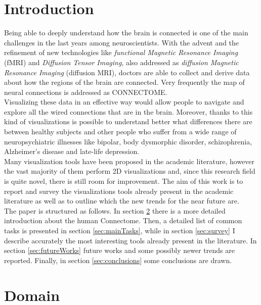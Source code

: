 \documentclass{article}
\begin{document}
\begin{multicols}{2}
\raggedcolumns

\section{Introduction}
\label{sec:introduction}

Being able to deeply understand how the brain is connected is one of the main challenges in the last years among neuroscientists. With the advent and the refinement of new technologies like \textit{functional Magnetic Resonance Imaging} (fMRI) and \textit{Diffusion Tensor Imaging}, also addressed as \textit{diffusion Magnetic Resonance Imaging} (diffusion MRI), doctors are able to collect and derive data about how the regions of the brain are connected. Very frequently the map of neural connections is addressed as CONNECTOME.\\
Visualizing these data in an effective way would allow people to navigate and explore all the wired connections that are in the brain. Moreover, thanks to this kind of visualizations is possible to understand better what differences there are between healthy subjects and other people who suffer from a wide range of neuropsychiatric illnesses like bipolar, body dysmorphic disorder, schizophrenia, Alzheimer's disease and late-life depression. \\
Many visualization tools have been proposed in the academic literature, however the vast majority of them perform 2D visualizations and, since this research field is quite novel, there is still room for improvement.
The aim of this work is to report and survey the visualizations tools already present in the academic literature as well as to outline which the new trends for the near future are.\\
The paper is structured as follows. In section \ref{sec:domain} there is a more detailed introduction about the human Connectome. Then, a detailed list of common tasks is presented in section \ref{sec:mainTasks}, while in section \ref{sec:survey} I describe accurately the most interesting tools already present in the literature. In section \ref{sec:futureWorks} future works and some possibly newer trends are reported. Finally, in section \ref{sec:conclusions} some conclusions are drawn.


\section{Domain}
\label{sec:domain}


\end{multicols}
\end{document}
